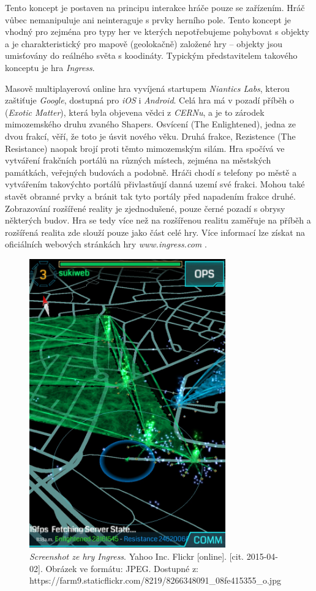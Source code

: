 \documentclass[twoside,12pt]{article}
\begin{document}
Tento koncept je postaven na principu interakce hráče pouze se zařízením. Hráč vůbec nemanipuluje ani neinteraguje s prvky herního pole. Tento koncept je vhodný pro zejména pro typy her ve kterých nepotřebujeme pohybovat s objekty a je charakteristický pro mapově (geolokačně) založené hry -- objekty jsou umisťovány do reálného světa s koodináty. Typickým představitelem takového konceptu je hra \textit{Ingress}.

%
% 

Masově multiplayerová online hra vyvíjená startupem \textit{Niantics Labs}, kterou zaštiťuje \textit{Google}, dostupná pro \textit{iOS} i \textit{Android}. Celá hra má v pozadí příběh o  (\textit{Exotic Matter}), která byla objevena vědci z \textit{CERNu}, a je to zárodek mimozemského druhu zvaného Shapers. Osvícení (The Enlightened), jedna ze dvou frakcí, věří, že toto je úsvit nového věku. Druhá frakce, Rezistence (The Resistance) naopak brojí proti těmto mimozemským silám. Hra spočívá ve vytváření frakčních portálů na různých místech, zejména na městských památkách, veřejných budovách a podobně. Hráči chodí s telefony po městě a vytvářením takovýchto portálů přivlastňují danná uzemí své frakci. Mohou také stavět obranné prvky a bránit tak tyto portály před napadením frakce druhé. Zobrazování rozšířené reality je zjednodušené, pouze černé pozadí s obrysy některých budov. Hra se tedy více než na rozšířenou realitu zaměřuje na příběh a rozšířená realita zde slouží pouze jako část celé hry. Více informací lze získat na oficiálních webových stránkách hry \textit{www.ingress.com} \cite{ingress}.


\begin{figure}[H]
    \centering
    \includegraphics[width=320px, center]{images/ingress.jpg}
    \caption{\textit{Screenshot ze hry Ingress}. Yahoo Inc. Flickr [online]. [cit. 2015-04-02]. Obrázek ve formátu: JPEG. Dostupné z: https://farm9.staticflickr.com/8219/8266348091\_08fe415355\_o.jpg}
    \label{ingress_screenshot}
\end{figure}
\end{document}
